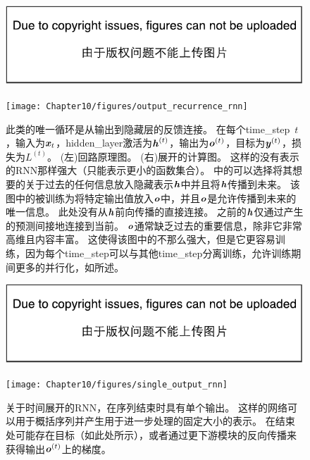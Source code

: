 \begin{figure}[!htb]
\ifOpenSource
\centerline{\includegraphics{figure.pdf}}
\else
\centerline{\texttt{[image: Chapter10/figures/output\_recurrence\_rnn]}}
\fi
\caption{此类的唯一循环是从输出到隐藏层的反馈连接。
在每个\gls{time_step}~$t$，输入为$\boldsymbol{\mathit{x}}_t$，\gls{hidden_layer}激活为$\boldsymbol{\mathit{h}}^{(t)}$，输出为$\boldsymbol{\mathit{o}}^{(t)}$，目标为$\boldsymbol{\mathit{y}}^{(t)}$，损失为$L^{(t)}$。
(左)回路原理图。
(右)展开的计算图。
这样的没有表示的RNN那样强大（只能表示更小的函数集合）。
中的可以选择将其想要的关于过去的任何信息放入隐藏表示$\boldsymbol{\mathit{h}}$中并且将$\boldsymbol{\mathit{h}}$传播到未来。
该图中的被训练为将特定输出值放入$\boldsymbol{\mathit{o}}$中，并且$\boldsymbol{\mathit{o}}$是允许传播到未来的唯一信息。
此处没有从$\boldsymbol{\mathit{h}}$前向传播的直接连接。
之前的$\boldsymbol{\mathit{h}}$仅通过产生的预测间接地连接到当前。
$\boldsymbol{\mathit{o}}$通常缺乏过去的重要信息，除非它非常高维且内容丰富。
这使得该图中的不那么强大，但是它更容易训练，因为每个\gls{time_step}可以与其他\gls{time_step}分离训练，允许训练期间更多的并行化，如所述。
}
\label{fig:chap10_output_recurrence_rnn}
\end{figure}

\begin{figure}[!htb]
\ifOpenSource
\centerline{\includegraphics{figure.pdf}}
\else
\centerline{\texttt{[image: Chapter10/figures/single\_output\_rnn]}}
\fi
\caption{关于时间展开的\gls{RNN}，在序列结束时具有单个输出。
这样的网络可以用于概括序列并产生用于进一步处理的固定大小的表示。
在结束处可能存在目标（如此处所示），或者通过更下游模块的反向传播来获得输出$\boldsymbol{\mathit{o}}^{(t)}$上的梯度。
}
\label{fig:chap10_single_output_rnn}
\end{figure}

